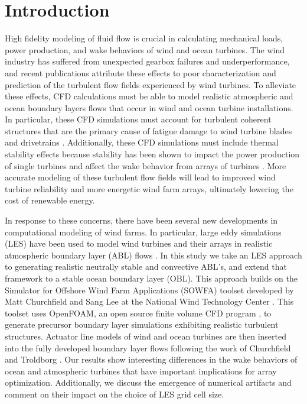 \section{Introduction}
High fidelity modeling of fluid flow is crucial in calculating mechanical loads, power production, and wake behaviors of wind and ocean turbines.  The wind industry has suffered from unexpected gearbox failures and underperformance, and recent publications attribute these effects to poor characterization and prediction of the turbulent flow fields experienced by wind turbines.  To alleviate these effects, CFD calculations must be able to model realistic atmospheric and ocean boundary layers flows that occur in wind and ocean turbine installations.  In particular, these CFD simulations must account for turbulent coherent structures that are the primary cause of fatigue damage to wind turbine blades and drivetrains \cite{kelley_impact_2005,lee_atmospheric_2011}.  Additionally, these CFD simulations must include thermal stability effects because stability has been shown to impact the power production of single turbines and affect the wake behavior from arrays of turbines \cite{wharton_atmospheric_2012,wharton_assessing_2011}.  More accurate modeling of these turbulent flow fields will lead to improved wind turbine reliability and more energetic wind farm arrays, ultimately lowering the cost of renewable energy.

In response to these concerns, there have been several new developments in computational modeling of wind farms.  In particular, large eddy simulations (LES) have been used to  model wind turbines and their arrays in realistic atmospheric boundary layer (ABL) flows \cite{calaf_large_2010,lu_large-eddy_2011,porte-agel_large-eddy_2011,wu_large-eddy_2010,sanderse_review_2011}.  In this study we take an LES approach to generating realistic neutrally stable and convective ABL's, and extend that framework to a stable ocean boundary layer (OBL).  This approach builds on the Simulator for Offshore Wind Farm Applications (SOWFA) toolset developed by Matt Churchfield and Sang Lee at the National Wind Technology Center \cite{SOWFA}.  This toolset uses OpenFOAM, an open source finite volume CFD program \cite{OpenFOAM}, to generate precursor boundary layer simulations exhibiting realistic turbulent structures.  Actuator line models of wind and ocean turbines are then inserted into the fully developed boundary layer flows following the work of Churchfield and Troldborg \cite{churchfield_large-eddy_2012,churchfield_numerical_2012,troldborg_actuator_2007}.  Our results show interesting differences in the wake behaviors of ocean and atmospheric turbines that have important implications for array optimization.  Additionally, we discuss the emergence of numerical artifacts and comment on their impact on the choice of LES grid cell size.
